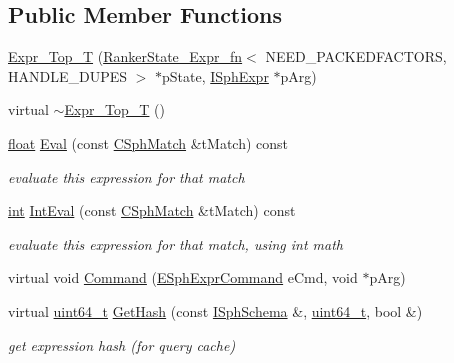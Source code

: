 \subsection*{Public Member Functions}
\begin{DoxyCompactItemize}
\item 
\hyperlink{structExpr__Top__T_a7848fcd63107e55fe879f99bbbf0672e}{Expr\-\_\-\-Top\-\_\-\-T} (\hyperlink{structRankerState__Expr__fn}{Ranker\-State\-\_\-\-Expr\-\_\-fn}$<$ N\-E\-E\-D\-\_\-\-P\-A\-C\-K\-E\-D\-F\-A\-C\-T\-O\-R\-S, H\-A\-N\-D\-L\-E\-\_\-\-D\-U\-P\-E\-S $>$ $\ast$p\-State, \hyperlink{structISphExpr}{I\-Sph\-Expr} $\ast$p\-Arg)
\item 
virtual \hyperlink{structExpr__Top__T_a49928c142a674e616a9ecea6d4d8ec0a}{$\sim$\-Expr\-\_\-\-Top\-\_\-\-T} ()
\item 
\hyperlink{sphinxexpr_8cpp_a0e0d0739f7035f18f949c2db2c6759ec}{float} \hyperlink{structExpr__Top__T_ad9fe7effad90442528e2662741e6fcff}{Eval} (const \hyperlink{classCSphMatch}{C\-Sph\-Match} \&t\-Match) const 
\begin{DoxyCompactList}\small\item\em evaluate this expression for that match \end{DoxyCompactList}\item 
\hyperlink{sphinxexpr_8cpp_a4a26e8f9cb8b736e0c4cbf4d16de985e}{int} \hyperlink{structExpr__Top__T_a175ea39b37a5645a7d50c476ee6852a4}{Int\-Eval} (const \hyperlink{classCSphMatch}{C\-Sph\-Match} \&t\-Match) const 
\begin{DoxyCompactList}\small\item\em evaluate this expression for that match, using int math \end{DoxyCompactList}\item 
virtual void \hyperlink{structExpr__Top__T_a0062a2d98f9ef78af48a9e3708318878}{Command} (\hyperlink{sphinxexpr_8h_a30be184fb07bd80c271360fc6094c818}{E\-Sph\-Expr\-Command} e\-Cmd, void $\ast$p\-Arg)
\item 
virtual \hyperlink{sphinxstd_8h_aaa5d1cd013383c889537491c3cfd9aad}{uint64\-\_\-t} \hyperlink{structExpr__Top__T_ad9ae72bd37d60d4005152d69d6bf5cc7}{Get\-Hash} (const \hyperlink{classISphSchema}{I\-Sph\-Schema} \&, \hyperlink{sphinxstd_8h_aaa5d1cd013383c889537491c3cfd9aad}{uint64\-\_\-t}, bool \&)
\begin{DoxyCompactList}\small\item\em get expression hash (for query cache) \end{DoxyCompactList}\end{DoxyCompactItemize}
